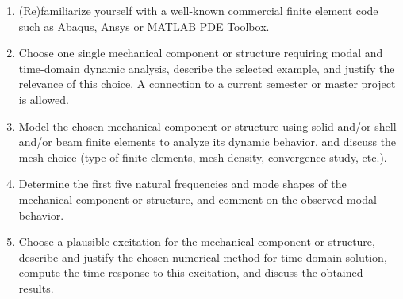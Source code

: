 \documentclass[12pt]{article}
\begin{document}
\begin{enumerate}
  \item (Re)familiarize yourself with a well-known commercial finite element code such as Abaqus, Ansys or MATLAB PDE Toolbox.
  \item Choose one single mechanical component or structure requiring modal and time-domain dynamic analysis, describe the selected example, and justify the relevance of this choice. A connection to a current semester or master project is allowed.
  \item Model the chosen mechanical component or structure using solid and/or shell and/or beam finite elements to analyze its dynamic behavior, and discuss the mesh choice (type of finite elements, mesh density, convergence study, etc.).
  \item Determine the first five natural frequencies and mode shapes of the mechanical component or structure, and comment on the observed modal behavior.
  \item Choose a plausible excitation for the mechanical component or structure, describe and justify the chosen numerical method for time-domain solution, compute the time response to this excitation, and discuss the obtained results.
\end{enumerate}
\end{document}

